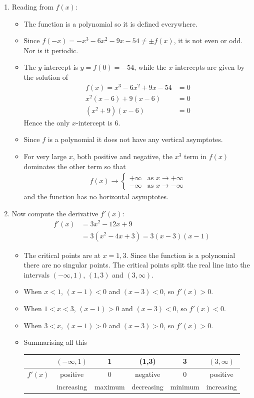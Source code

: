 \begin{eg}[$f(x) = x^3 - 6x^2 + 9x - 54$]
\begin{enumerate}[(1)]
\item Reading from $f(x)$:
\begin{itemize}
 \item The function is a polynomial so it is defined everywhere.
\item Since $f(-x) = -x^3-6x^2-9x-54 \neq \pm f(x)$, it is not even or
odd. Nor is it periodic.
\item The $y$-intercept is $y=f(0)=-54$, while the $x$-intercepts are given by
the solution of
\begin{align*}
  f(x)=x^3-6x^2+9x-54 &= 0\\
  x^2(x-6) + 9(x-6) &=0 \\
  (x^2+9)(x-6) &= 0
\end{align*}
Hence the only $x$-intercept is $6$.

\item Since $f$ is a polynomial it does not have any vertical asymptotes.
\item For very large $x$, both positive and negative, the $x^3$ term in $f(x)$
dominates the other term so that
\begin{align*}
f(x)\rightarrow\begin{cases}+\infty &\text{as }x\rightarrow+\infty \\
                            -\infty &\text{as }x\rightarrow-\infty
                \end{cases}
\end{align*}
and the function has no horizontal asymptotes.
\end{itemize}

\item Now compute the derivative $f'(x)$:
\begin{align*}
f'(x) &= 3x^2-12x+9 \\
  &= 3(x^2-4x+3) = 3(x-3)(x-1)
\end{align*}
\begin{itemize}
 \item The critical points are at $x=1,3$. Since the function is a polynomial
there are no singular points. The critical points split the real line into the
intervals
$(-\infty,1)$, $(1,3)$ and $(3,\infty)$.
\item When $x<1$, $(x-1)<0$ and $(x-3)<0$, so $f'(x) > 0$.
\item When $1<x<3$, $(x-1)>0$ and $(x-3)<0$, so $f'(x) < 0$.
\item When $3<x$, $(x-1)>0$ and $(x-3)>0$, so $f'(x) > 0$.
\item Summarising all this
\begin{center}
 \begin{tabular}{|c|c||c||c||c||c|}
\hline
  & $(-\infty,1)$ & 1 & (1,3) & 3 & $(3,\infty)$\\
\hline
$f'(x)$  & positive & 0 & negative & 0 & positive \\
\hline
 & increasing & maximum & decreasing & minimum & increasing \\
\hline
 \end{tabular}
\end{center}


\end{itemize}
\end{enumerate}
\end{eg}
